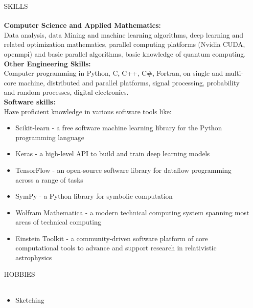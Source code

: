 \documentclass[a4paper]{article}
\newcommand{\lineunder} {
    \vspace*{-8pt} \\
    \hspace*{-18pt} \hrulefill \\
}
\newcommand{\header} [1] {
    {\hspace*{-18pt}\vspace*{6pt} \textsc{#1}}
    \vspace*{-6pt} \lineunder
}
\begin{document}
\header{SKILLS}
\textbf{Computer Science and Applied Mathematics: }\\
Data analysis, data Mining and machine learning algorithms, deep learning and related optimization mathematics, parallel computing platforms (Nvidia CUDA, openmpi) and basic parallel algorithms, basic knowledge of quantum computing. \\
\vspace*{2mm}
\textbf{Other Engineering Skills: } \\
Computer programming in Python, C, C++, C\#, Fortran, on single and multi-core machine, distributed and parallel platforms, signal processing, probability and random processes, digital electronics. \\
\vspace*{2mm}
\textbf{Software skills: }\\
Have proficient knowledge in various software tools like:
\begin{itemize} \itemsep 1pt
    \item Scikit-learn - a free software machine learning library for the Python programming language \\
    \item  Keras - a high-level API to build and train deep learning models \\
    \item TensorFlow - an open-source software library for dataflow programming across a range of tasks \\
    \item SymPy - a Python library for symbolic computation \\
    \item Wolfram Mathematica - a modern technical computing system spanning most areas of technical computing \\
    \item Einstein Toolkit - a community-driven software platform of core computational tools to advance and support research in relativistic astrophysics \\
\end{itemize}
\vspace{2mm}

\header{HOBBIES}
\begin{itemize}
\item Sketching
\end{itemize}
\vspace{2mm}
\ 
\end{document}
